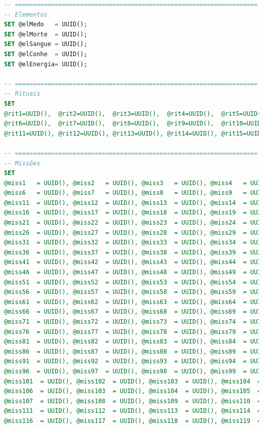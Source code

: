 \documentclass[12pt,a4paper]{report}
\begin{document}
\begin{lstlisting}[language=SQL, caption=population.sql]
-- ===================================================================
-- Elementos
SET @elMedo   = UUID();
SET @elMorte  = UUID();
SET @elSangue = UUID();
SET @elConhe  = UUID();
SET @elEnergia= UUID();

-- ===================================================================
-- Rituais
SET
@rit1=UUID(),  @rit2=UUID(),  @rit3=UUID(),  @rit4=UUID(),  @rit5=UUID(),
@rit6=UUID(),  @rit7=UUID(),  @rit8=UUID(),  @rit9=UUID(),  @rit10=UUID(),
@rit11=UUID(), @rit12=UUID(), @rit13=UUID(), @rit14=UUID(), @rit15=UUID();

-- ===================================================================
-- Missões
SET
@miss1   = UUID(), @miss2   = UUID(), @miss3   = UUID(), @miss4   = UUID(), @miss5   = UUID(),
@miss6   = UUID(), @miss7   = UUID(), @miss8   = UUID(), @miss9   = UUID(), @miss10  = UUID(),
@miss11  = UUID(), @miss12  = UUID(), @miss13  = UUID(), @miss14  = UUID(), @miss15  = UUID(),
@miss16  = UUID(), @miss17  = UUID(), @miss18  = UUID(), @miss19  = UUID(), @miss20  = UUID(),
@miss21  = UUID(), @miss22  = UUID(), @miss23  = UUID(), @miss24  = UUID(), @miss25  = UUID(),
@miss26  = UUID(), @miss27  = UUID(), @miss28  = UUID(), @miss29  = UUID(), @miss30  = UUID(),
@miss31  = UUID(), @miss32  = UUID(), @miss33  = UUID(), @miss34  = UUID(), @miss35  = UUID(),
@miss36  = UUID(), @miss37  = UUID(), @miss38  = UUID(), @miss39  = UUID(), @miss40  = UUID(),
@miss41  = UUID(), @miss42  = UUID(), @miss43  = UUID(), @miss44  = UUID(), @miss45  = UUID(),
@miss46  = UUID(), @miss47  = UUID(), @miss48  = UUID(), @miss49  = UUID(), @miss50  = UUID(),
@miss51  = UUID(), @miss52  = UUID(), @miss53  = UUID(), @miss54  = UUID(), @miss55  = UUID(),
@miss56  = UUID(), @miss57  = UUID(), @miss58  = UUID(), @miss59  = UUID(), @miss60  = UUID(),
@miss61  = UUID(), @miss62  = UUID(), @miss63  = UUID(), @miss64  = UUID(), @miss65  = UUID(),
@miss66  = UUID(), @miss67  = UUID(), @miss68  = UUID(), @miss69  = UUID(), @miss70  = UUID(),
@miss71  = UUID(), @miss72  = UUID(), @miss73  = UUID(), @miss74  = UUID(), @miss75  = UUID(),
@miss76  = UUID(), @miss77  = UUID(), @miss78  = UUID(), @miss79  = UUID(), @miss80  = UUID(),
@miss81  = UUID(), @miss82  = UUID(), @miss83  = UUID(), @miss84  = UUID(), @miss85  = UUID(),
@miss86  = UUID(), @miss87  = UUID(), @miss88  = UUID(), @miss89  = UUID(), @miss90  = UUID(),
@miss91  = UUID(), @miss92  = UUID(), @miss93  = UUID(), @miss94  = UUID(), @miss95  = UUID(),
@miss96  = UUID(), @miss97  = UUID(), @miss98  = UUID(), @miss99  = UUID(), @miss100 = UUID(),
@miss101  = UUID(), @miss102  = UUID(), @miss103  = UUID(), @miss104  = UUID(), @miss105 = UUID(),
@miss106  = UUID(), @miss103  = UUID(), @miss104  = UUID(), @miss105  = UUID(), @miss106 = UUID(),
@miss107  = UUID(), @miss108  = UUID(), @miss109  = UUID(), @miss110  = UUID(), @miss111 = UUID(),
@miss111  = UUID(), @miss112  = UUID(), @miss113  = UUID(), @miss114  = UUID(), @miss115 = UUID(),
@miss116  = UUID(), @miss117  = UUID(), @miss118  = UUID(), @miss119  = UUID(), @miss120 = UUID();


\end{lstlisting}
\end{document}
